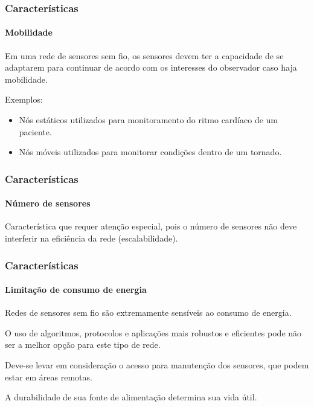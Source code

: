 \documentclass[notes]{beamer}
\begin{document}
\begin{frame}
\frametitle{Características}
\framesubtitle{Mobilidade}

\begin{block}

Em uma rede de sensores sem fio, os sensores devem ter a capacidade de se adaptarem para continuar de acordo com os interesses do observador caso haja mobilidade.
\end{block} \pause

\begin{exampleblock}

Exemplos: \pause

\begin{itemize}
\item Nós estáticos utilizados para monitoramento do ritmo cardíaco de um paciente.
\item Nós móveis utilizados para monitorar condições dentro de um tornado\cite{Twister}.
\end{itemize}

\end{exampleblock}

\end{frame}

\begin{frame}
\frametitle{Características}
\framesubtitle{Número de sensores}

\begin{block}

Característica que requer atenção especial, pois o número de sensores não deve interferir na eficiência da rede (escalabilidade).
\end{block}

\end{frame}

\begin{frame}
\frametitle{Características}
\framesubtitle{Limitação de consumo de energia}

\begin{block}

Redes de sensores sem fio são extremamente sensíveis ao consumo de energia. 
\end{block} \pause
\begin{block}

O uso de algoritmos, protocolos e aplicações mais robustos e eficientes pode não ser a melhor opção para este tipo de rede. 

\end{block} \pause

\begin{block}

Deve-se levar em consideração o acesso para manutenção dos sensores, que podem estar em áreas remotas.

\end{block} \pause

\begin{block}

A durabilidade de sua fonte de alimentação determina sua vida útil.

\end{block}

\end{frame}
\end{document}
